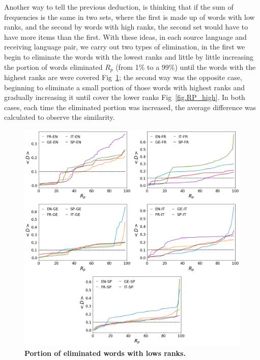 \documentclass[10pt,letterpaper]{article} %
\begin{document}
Another way to tell the previous deduction, is thinking that if the sum of
frequencies is the same in two sets, where the first is made up of words with
low ranks, and the second by words with high ranks, the second set would have
to have more items than the first. With these ideas, in each source language
and receiving language pair, we carry out two types of elimination, in the
first we begin to eliminate the words with the lowest ranks and little by
little increasing the portion of words eliminated $R_{p}$ (from 1$\%$ to a
99$\%$) until the words with the highest ranks are were covered
Fig~\ref{fig.RP_low}; the second way was the opposite case, beginning to
eliminate a small portion of those words with highest ranks and gradually
increasing it until cover the lower ranks Fig~\ref{fig.RP_high}. In both cases,
each time the eliminated portion was increased, the average difference was
calculated to observe the similarity.


\begin{figure}[!h]
	\begin{adjustwidth}{-2.5cm}{1cm}
		\centering
		\includegraphics[scale=.38]{Rp_bajos.png}
		\caption{{\bf Portion of eliminated words with lows ranks.} }
		\label{fig.RP_low}
	\end{adjustwidth}
\end{figure}
\end{document}
